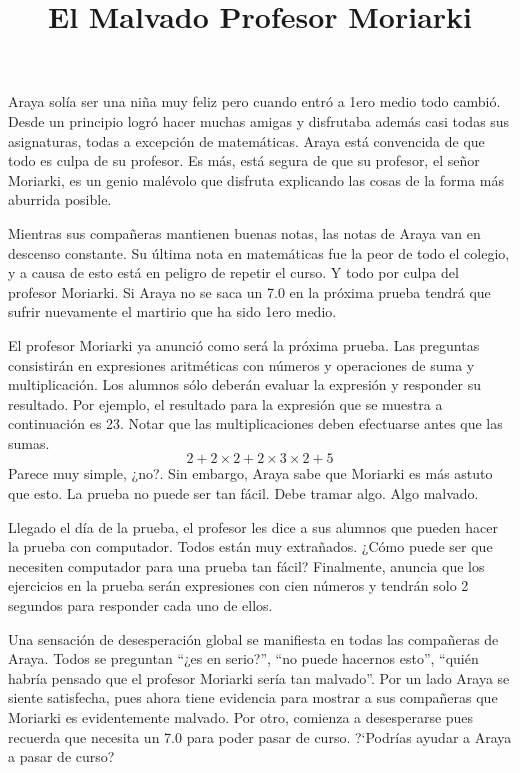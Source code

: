 \documentclass{oci}
\title{El Malvado Profesor Moriarki}
\begin{document}
\begin{problemDescription}
Araya solía ser una niña muy feliz pero cuando entró a 1ero medio todo cambió.
Desde un principio logró hacer muchas amigas y disfrutaba además casi todas sus
asignaturas, todas a excepción de matemáticas.
Araya está convencida de que todo es culpa de su profesor.
Es más, está segura de que su profesor, el señor Moriarki, es un genio malévolo
que disfruta explicando las cosas de la forma más aburrida posible.

Mientras sus compañeras mantienen buenas notas, las notas de Araya van en
descenso constante.
Su última nota en matemáticas fue la peor de todo el colegio, y a causa de esto
está en peligro de repetir el curso.
Y todo por culpa del profesor Moriarki.
Si Araya no se saca un 7.0 en la próxima prueba tendrá que sufrir nuevamente el
martirio que ha sido 1ero medio.

El profesor Moriarki ya anunció como será la próxima prueba.
Las preguntas consistirán en expresiones aritméticas con números y operaciones
de suma y multiplicación.
Los alumnos sólo deberán evaluar la expresión y responder su resultado.
Por ejemplo, el resultado para la expresión que se muestra a continuación es 23.
Notar que las multiplicaciones deben efectuarse antes que las sumas.
$$
2 + 2 \times 2 + 2\times 3 \times 2 + 5
$$
Parece muy simple, ¿no?.
Sin embargo, Araya sabe que Moriarki es más astuto que esto.
La prueba no puede ser tan fácil.
Debe tramar algo.
Algo malvado.

Llegado el día de la prueba, el profesor les dice a sus alumnos que pueden hacer
la prueba con computador.
Todos están muy extrañados.
¿Cómo puede ser que necesiten computador para una prueba tan fácil?
Finalmente, anuncia que los ejercicios en la prueba serán expresiones con cien
números y tendrán solo 2 segundos para responder cada uno de ellos.

Una sensación de desesperación global se manifiesta en todas las compañeras de
Araya.
Todos se preguntan ``¿es en serio?'', ``no puede hacernos esto'', ``quién
habría pensado que el profesor Moriarki sería tan malvado''.
Por un lado Araya se siente satisfecha, pues ahora tiene evidencia para mostrar a sus
compañeras que Moriarki es evidentemente malvado.
Por otro, comienza a desesperarse pues recuerda que necesita un 7.0 para poder
pasar de curso.
?`Podrías ayudar a Araya a pasar de curso?


\end{problemDescription}
\end{document}
